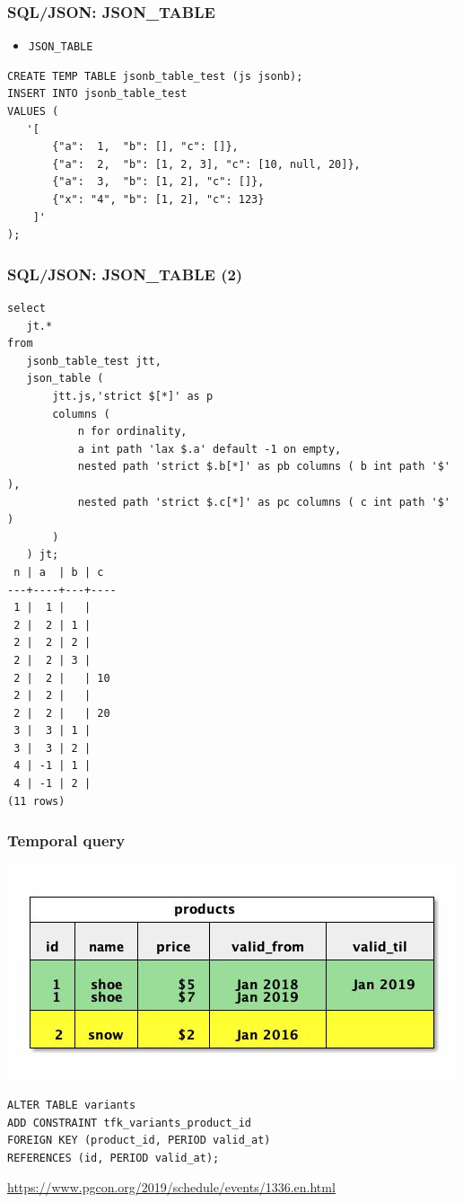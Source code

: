 \begin{frame}[fragile]
\frametitle{SQL/JSON: JSON\_TABLE}
\begin{itemize}
\item \texttt{JSON\_TABLE}
\end{itemize}
\footnotesize
\begin{verbatim}
CREATE TEMP TABLE jsonb_table_test (js jsonb);
INSERT INTO jsonb_table_test
VALUES (
   '[
       {"a":  1,  "b": [], "c": []},
       {"a":  2,  "b": [1, 2, 3], "c": [10, null, 20]},
       {"a":  3,  "b": [1, 2], "c": []},
       {"x": "4", "b": [1, 2], "c": 123}
    ]'
);
\end{verbatim}
\end{frame}

\begin{frame}[fragile]
\footnotesize
\frametitle{SQL/JSON: JSON\_TABLE (2)}
\begin{verbatim}
select
   jt.*
from
   jsonb_table_test jtt,
   json_table (
       jtt.js,'strict $[*]' as p
       columns (
           n for ordinality,
           a int path 'lax $.a' default -1 on empty,
           nested path 'strict $.b[*]' as pb columns ( b int path '$' ),
           nested path 'strict $.c[*]' as pc columns ( c int path '$' )
       )
   ) jt;
 n | a  | b | c  
---+----+---+----
 1 |  1 |   |   
 2 |  2 | 1 |   
 2 |  2 | 2 |   
 2 |  2 | 3 |   
 2 |  2 |   | 10
 2 |  2 |   |   
 2 |  2 |   | 20
 3 |  3 | 1 |   
 3 |  3 | 2 |   
 4 | -1 | 1 |   
 4 | -1 | 2 |   
(11 rows)
\end{verbatim}
\end{frame}

\begin{frame}[fragile]
\frametitle{Temporal query}

\includegraphics{temporal.jpg}

\begin{verbatim}
ALTER TABLE variants
ADD CONSTRAINT tfk_variants_product_id
FOREIGN KEY (product_id, PERIOD valid_at)
REFERENCES (id, PERIOD valid_at);
\end{verbatim}

\footnotesize\url{https://www.pgcon.org/2019/schedule/events/1336.en.html}

\end{frame}

